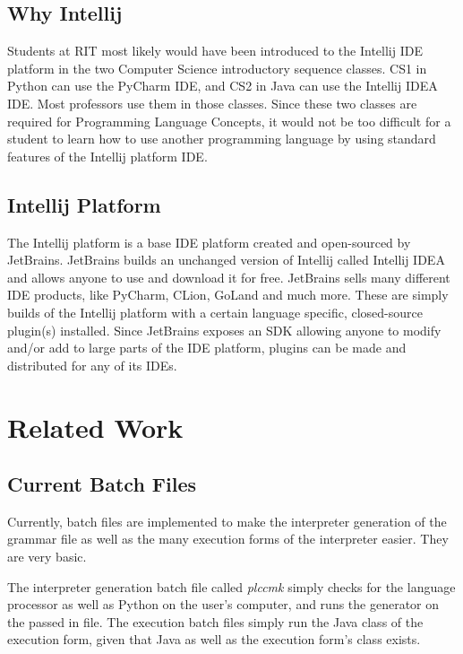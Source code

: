 \documentclass[conference, letterpaper]{IEEEtran}
\begin{document}
\subsection{Why Intellij}\label{subsec:why-intellij}
Students at RIT most likely would have been introduced to the Intellij IDE platform in the two Computer Science introductory sequence classes.
CS1 in Python can use the PyCharm IDE, and CS2 in Java can use the Intellij IDEA IDE.
Most professors use them in those classes.
Since these two classes are required for Programming Language Concepts, it would not be too difficult for a student to learn how to use another programming language by using standard features of the Intellij platform IDE\@.

\subsection{Intellij Platform}\label{subsec:intellij-platform-sdk}
The Intellij platform is a base IDE platform created and open-sourced by JetBrains.
JetBrains builds an unchanged version of Intellij called Intellij IDEA and allows anyone to use and download it for free.
JetBrains sells many different IDE products, like PyCharm, CLion, GoLand and much more.
These are simply builds of the Intellij platform with a certain language specific, closed-source plugin(s) installed.
Since JetBrains exposes an SDK allowing anyone to modify and/or add to large parts of the IDE platform, plugins can be made and distributed for any of its IDEs.


\section{Related Work}\label{sec:related-work}
\subsection{Current Batch Files}\label{subsec:current-batch-files}
Currently, batch files are implemented to make the interpreter generation of the grammar file as well as the many execution forms of the interpreter easier.
They are very basic.

The interpreter generation batch file called \textit{plccmk} simply checks for the language processor as well as Python on the user's computer, and runs the generator on the passed in file.
The execution batch files simply run the Java class of the execution form, given that Java as well as the execution form's class exists.
\end{document}
